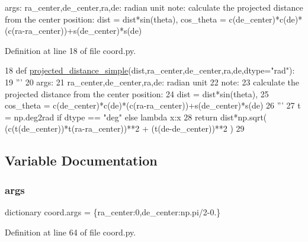 \begin{DoxyVerb}args:
    ra_center,de_center,ra,de: radian unit
note:
    calculate the projected distance from the center position:
    dist = dist*sin(theta),
    cos_theta = c(de_center)*c(de)*(c(ra-ra_center))+s(de_center)*s(de)
\end{DoxyVerb}
 

Definition at line 18 of file coord.\+py.


\begin{DoxyCode}
18 \textcolor{keyword}{def }\hyperlink{namespacecoord_a6cca1fe4ad65d56023a02550cbba8ce8}{projected\_distance\_simple}(dist,ra\_center,de\_center,ra,de,dtype="rad"):
19     \textcolor{stringliteral}{'''}
20 \textcolor{stringliteral}{    args:}
21 \textcolor{stringliteral}{        ra\_center,de\_center,ra,de: radian unit}
22 \textcolor{stringliteral}{    note:}
23 \textcolor{stringliteral}{        calculate the projected distance from the center position:}
24 \textcolor{stringliteral}{        dist = dist*sin(theta),}
25 \textcolor{stringliteral}{        cos\_theta = c(de\_center)*c(de)*(c(ra-ra\_center))+s(de\_center)*s(de)}
26 \textcolor{stringliteral}{    '''}
27     t = np.deg2rad \textcolor{keywordflow}{if} dtype == \textcolor{stringliteral}{"deg"} \textcolor{keywordflow}{else} \textcolor{keyword}{lambda} x:x
28     \textcolor{keywordflow}{return} dist*np.sqrt( (c(t(de\_center))*t(ra-ra\_center))**2 + (t(de-de\_center))**2 )
29 
\end{DoxyCode}


\subsection{Variable Documentation}
\mbox{\label{namespacecoord_a87ee5c40fe361f2c1bfbea4ed5086028}} 
\subsubsection{\texorpdfstring{args}{args}}
{\footnotesize\ttfamily dictionary coord.\+args = \{\textquotesingle{}ra\+\_\+center\textquotesingle{}\+:0,\textquotesingle{}de\+\_\+center\textquotesingle{}\+:np.\+pi/2-\/0.\}}



Definition at line 64 of file coord.\+py.

\mbox{\label{namespacecoord_a9aa399b274864850fc9b9569a1256848}} 
